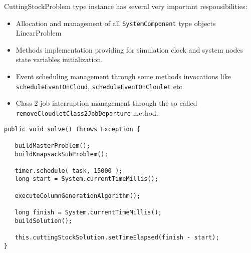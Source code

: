 \documentclass[10pt,a4paper]{article}
\begin{document}
CuttingStockProblem type instance has several very important responsibilities:

\begin{itemize}

\item Allocation and management of all \texttt{SystemComponent} type objects LinearProblem

\item Methods implementation providing for simulation clock and system nodes state variables initialization.

\item Event scheduling management through some methods invocations like \texttt{sche\-dule\-Event\-OnCloud}, \texttt{scheduleEventOnCloulet} etc.

\item Class 2 job interruption management through the so called \texttt{removeCloud\-let\-Class2JobDeparture} method.
\end{itemize}



\begin{lstlisting}[frame=lines, caption={\texttt{solve()} method implementation.}, label={code:solve}]
public void solve() throws Exception {

   buildMasterProblem();
   buildKnapsackSubProblem();

   timer.schedule( task, 15000 );
   long start = System.currentTimeMillis();
        
   executeColumnGenerationAlgorithm();
        
   long finish = System.currentTimeMillis();
   buildSolution();

   this.cuttingStockSolution.setTimeElapsed(finish - start);
}
\end{lstlisting}
\end{document}
